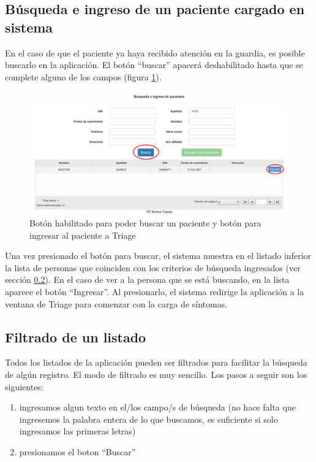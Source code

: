 \subsection{Búsqueda e ingreso de un paciente cargado en sistema}
En el caso de que el paciente ya haya recibido atención en la guardia, es posible buscarlo en la aplicación. El botón ``buscar'' apacerá deshabilitado hasta que se complete alguno de los campos (figura \ref{fig:inicio_busqueda}).
\begin{figure}
\centerline{\includegraphics[width=0.99\textwidth]{inicio_busqueda.png}}
\caption{Botón habilitado para poder buscar un paciente y botón para ingresar al paciente a Triage} \label{fig:inicio_busqueda}
\end{figure}
Una vez presionado el botón para buscar, el sistema muestra en el listado inferior la lista de personas que coinciden con los criterios de búsqueda ingresados (ver sección \ref{cap:filtrado_listado}). En el caso de ver a la persona que se está buscando, en la lista aparece el botón ``Ingresar''. Al presionarlo, el sistema redirige la aplicación a la ventana de Triage para comenzar con la carga de síntomas.

\subsection{Filtrado de un listado}\label{cap:filtrado_listado}
Todos los listados de la aplicación pueden ser filtrados para facilitar la búsqueda de algún registro. El modo de filtrado es muy sencillo. Los pasos a seguir son los siguientes:
\begin{enumerate}
\item ingresamos algun texto en el/los campo/s de búsqueda (no hace falta que ingresemos la palabra entera de lo que buscamos, es suficiente si solo ingresamos las primeras letras)
\item presionamos el boton ``Buscar''
\end{enumerate}

